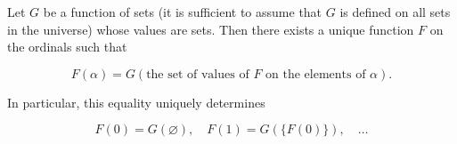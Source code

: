 Let $G$ be a function of sets (it is sufficient to assume that $G$ is defined on all sets in the universe) whose values are sets. Then there exists a unique function $F$ on the ordinals such that

$$F(\alpha) = G(\text{the set of values of } F \text{ on the elements of } \alpha).$$

In particular, this equality uniquely determines

$$F(0) = G(\varnothing), \quad F(1) = G(\{F(0)\}), \quad \ldots$$
